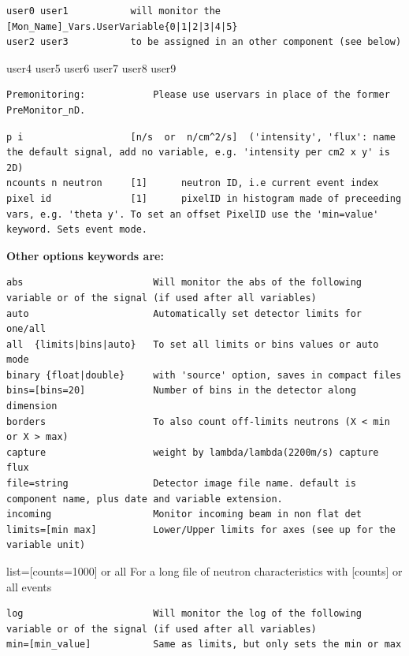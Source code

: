 \begin{verbatim}
user0 user1           will monitor the [Mon_Name]_Vars.UserVariable{0|1|2|3|4|5}
user2 user3           to be assigned in an other component (see below)
\end{verbatim}

user4 user5 user6 user7 user8 user9

\begin{verbatim}
Premonitoring:            Please use uservars in place of the former PreMonitor_nD.
\end{verbatim}

\begin{verbatim}
p i                   [n/s  or  n/cm^2/s]  ('intensity', 'flux': name the default signal, add no variable, e.g. 'intensity per cm2 x y' is 2D)
ncounts n neutron     [1]      neutron ID, i.e current event index
pixel id              [1]      pixelID in histogram made of preceeding vars, e.g. 'theta y'. To set an offset PixelID use the 'min=value' keyword. Sets event mode.
\end{verbatim}

\textbf{Other options keywords are:}

\begin{verbatim}
abs                       Will monitor the abs of the following variable or of the signal (if used after all variables)
auto                      Automatically set detector limits for one/all
all  {limits|bins|auto}   To set all limits or bins values or auto mode
binary {float|double}     with 'source' option, saves in compact files
bins=[bins=20]            Number of bins in the detector along dimension
borders                   To also count off-limits neutrons (X < min or X > max)
capture                   weight by lambda/lambda(2200m/s) capture flux
file=string               Detector image file name. default is component name, plus date and variable extension.
incoming                  Monitor incoming beam in non flat det
limits=[min max]          Lower/Upper limits for axes (see up for the variable unit)
\end{verbatim}

list=[counts=1000] or all For a long file of neutron characteristics with [counts] or all events

\begin{verbatim}
log                       Will monitor the log of the following variable or of the signal (if used after all variables)
min=[min_value]           Same as limits, but only sets the min or max
\end{verbatim}

